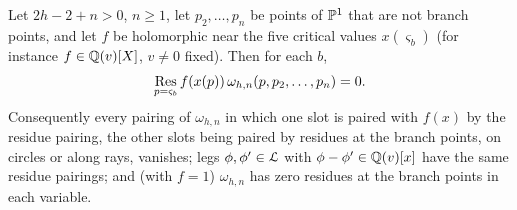 \begin{lem}
\label{lem:mod-xfun}
Let $2h-2+n>0$, $n\geq 1$, let $p_2,\dots,p_n$ be points of $\mathbb{P}^1$ that are not branch points, and let $f$ be holomorphic near the five critical values $x(\varsigma_b)$ (for instance $f\in\mathbb{Q}(v)[X]$, $v\neq 0$ fixed). Then for each $b$,
\[
\operatorname*{Res}_{p=\varsigma_b}f(x(p))\,\omega_{h,n}(p,p_2,\dots,p_n)=0 .
\]
Consequently every pairing of $\omega_{h,n}$ in which one slot is paired with $f(x)$ by the residue pairing, the other slots being paired by residues at the branch points, on circles or along rays, vanishes; legs $\phi,\phi'\in\mathcal{L}$ with $\phi-\phi'\in\mathbb{Q}(v)[x]$ have the same residue pairings; and (with $f=1$) $\omega_{h,n}$ has zero residues at the branch points in each variable.
\end{lem}

